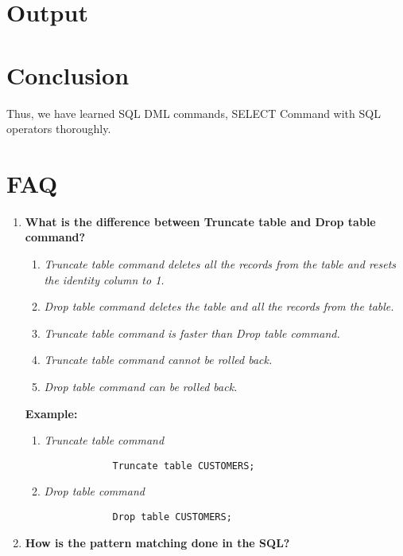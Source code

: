 \documentclass[11pt]{article}
\begin{document}
\section{Output}

\section{Conclusion}
Thus, we have learned SQL DML commands, SELECT Command with SQL operators thoroughly.
\clearpage

\section{FAQ}
\begin{enumerate}
	\item \textbf{What is the difference between Truncate table and Drop table command?}

	      \begin{enumerate}
		      \item \textit{Truncate table command deletes all the records from the table and resets the identity column to 1.}
		      \item \textit{Drop table command deletes the table and all the records from the table.}
		      \item \textit{Truncate table command is faster than Drop table command.}
		      \item \textit{Truncate table command cannot be rolled back.}
		      \item \textit{Drop table command can be rolled back.}
	      \end{enumerate}

		  \textbf{Example:}
	      \begin{enumerate}
		      \item \textit{Truncate table command}
		            \begin{verbatim}
			Truncate table CUSTOMERS;
		\end{verbatim}
		      \item \textit{Drop table command}
		            \begin{verbatim}
			Drop table CUSTOMERS;
		\end{verbatim}
	      \end{enumerate}

	\item \textbf{How is the pattern matching done in the SQL?}


\end{enumerate}
\end{document}
